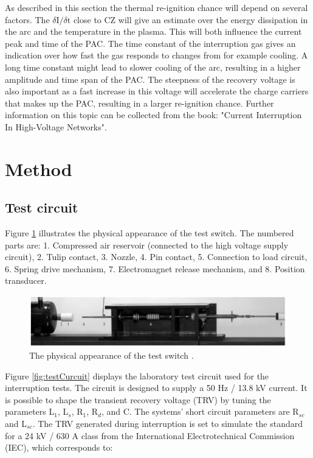 \documentclass[10pt,b5paper,twoside]{article}
\begin{document}
As described in this section the thermal re-ignition chance will depend on several factors. The $\delta \mathrm{I}/\delta \mathrm{t}$ close to CZ will give an estimate over the energy dissipation in the arc and the temperature in the plasma. This will both influence the current peak and time of the PAC. The time constant of the interruption gas gives an indication over how fast the gas responds to changes from for example cooling. A long time constant might lead to slower cooling of the arc, resulting in a higher amplitude and time span of the PAC. The steepness of the recovery voltage is also important as a fast increase in this voltage will accelerate the charge carriers that makes up the PAC, resulting in a larger re-ignition chance. Further information on this topic can be collected from the book: "Current Interruption In High-Voltage Networks".

\cleardoublepage

\section{Method}

\subsection{Test circuit} \label{sec:testCir}

Figure \ref{fig:testSwitchRiggEq} illustrates the physical appearance of the test switch. The numbered parts are: 1. Compressed air reservoir (connected to the high voltage supply circuit), 2. Tulip contact, 3. Nozzle, 4. Pin contact, 5. Connection to load circuit, 6. Spring drive mechanism, 7. Electromagnet release mechanism, and 8. Position transducer.

\begin{figure} [H]
\centering
\includegraphics[scale=0.4]{Bilder/Method/switchTest.png}
\caption{The physical appearance of the test switch \cite{bib:AFIMVLBA}.} \label{fig:testSwitchRiggEq}
\end{figure}

Figure \ref{fig:testCurcuit} displays the laboratory test circuit used for the interruption tests. The circuit is designed to supply a 50 Hz / 13.8 kV current. It is possible to shape the transient recovery voltage (TRV) by tuning the parameters L$_1$, L$_s$, R$_1$, R$_d$, and C. The systems' short circuit parameters are R$_{sc}$ and L$_{sc}$. The TRV generated during interruption is set to simulate the standard for a 24 kV / 630 A class from the International Electrotechnical Commission (IEC), which corresponds to:
\end{document}
